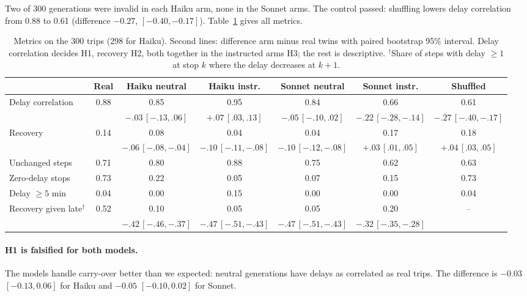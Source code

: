 \documentclass[11pt,a4paper]{article}
\begin{document}
Two of 300 generations were invalid in each Haiku arm, none in the Sonnet arms. The control passed: shuffling lowers delay correlation from 0.88 to 0.61 (difference $-0.27$, $[-0.40, -0.17]$). Table~\ref{tab:results} gives all metrics.

\begin{table}[ht]
\centering
\footnotesize
\setlength{\tabcolsep}{3.5pt}
\begin{tabular}{lcccccc}
\toprule
 & Real & Haiku neutral & Haiku instr. & Sonnet neutral & Sonnet instr. & Shuffled \\
\midrule
Delay correlation & 0.88 & 0.85 & 0.95 & 0.84 & 0.66 & 0.61 \\
 & & {\scriptsize $-.03\,[-.13,.06]$} & {\scriptsize $+.07\,[.03,.13]$} & {\scriptsize $-.05\,[-.10,.02]$} & {\scriptsize $-.22\,[-.28,-.14]$} & {\scriptsize $-.27\,[-.40,-.17]$} \\
Recovery & 0.14 & 0.08 & 0.04 & 0.04 & 0.17 & 0.18 \\
 & & {\scriptsize $-.06\,[-.08,-.04]$} & {\scriptsize $-.10\,[-.11,-.08]$} & {\scriptsize $-.10\,[-.12,-.08]$} & {\scriptsize $+.03\,[.01,.05]$} & {\scriptsize $+.04\,[.03,.05]$} \\
\midrule
Unchanged steps & 0.71 & 0.80 & 0.88 & 0.75 & 0.62 & 0.63 \\
Zero-delay stops & 0.73 & 0.22 & 0.05 & 0.07 & 0.15 & 0.73 \\
Delay $\ge 5$ min & 0.04 & 0.00 & 0.15 & 0.00 & 0.00 & 0.04 \\
\midrule
Recovery given late$^\dagger$ & 0.52 & 0.10 & 0.05 & 0.05 & 0.20 & -- \\
 & & {\scriptsize $-.42\,[-.46,-.37]$} & {\scriptsize $-.47\,[-.51,-.43]$} & {\scriptsize $-.47\,[-.51,-.43]$} & {\scriptsize $-.32\,[-.35,-.28]$} & \\
\bottomrule
\end{tabular}
\caption{Metrics on the 300 trips (298 for Haiku). Second lines: difference arm minus real twins with paired bootstrap 95\% interval. Delay correlation decides H1, recovery H2, both together in the instructed arms H3; the rest is descriptive. $^\dagger$Share of steps with delay $\ge 1$ at stop $k$ where the delay decreases at $k{+}1$.}
\label{tab:results}
\end{table}

\paragraph{H1 is falsified for both models.} The models handle carry-over better than we expected: neutral generations have delays as correlated as real trips. The difference is $-0.03$ $[-0.13, 0.06]$ for Haiku and $-0.05$ $[-0.10, 0.02]$ for Sonnet.
\end{document}
